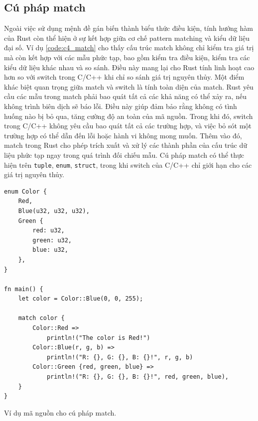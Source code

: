 \subsection{Cú pháp match}

Ngoài việc sử dụng mệnh đề gán biến thành biểu thức điều kiện, tính hướng hàm của Rust còn thể hiện ở sự kết hợp giữa cơ chế pattern matching và kiểu dữ liệu đại số.
Ví dụ \ref{code:c4_match} cho thấy cấu trúc match không chỉ kiểm tra giá trị mà còn kết hợp với các mẫu phức tạp, bao gồm kiểm tra điều kiện, kiểm tra các kiểu dữ liệu khác nhau và so sánh.
Điều này mang lại cho Rust tính linh hoạt cao hơn so với switch trong C/C++ khi chỉ so sánh giá trị nguyên thủy.
Một điểm khác biệt quan trọng giữa match và switch là tính toàn diện của match.
Rust yêu cầu các mẫu trong match phải bao quát tất cả các khả năng có thể xảy ra, nếu không trình biên dịch sẽ báo lỗi.
Điều này giúp đảm bảo rằng không có tình huống nào bị bỏ qua, tăng cường độ an toàn của mã nguồn.
Trong khi đó, switch trong C/C++ không yêu cầu bao quát tất cả các trường hợp, và việc bỏ sót một trường hợp có thể dẫn đến lỗi hoặc hành vi không mong muốn.
Thêm vào đó, match trong Rust cho phép trích xuất và xử lý các thành phần của cấu trúc dữ liệu phức tạp ngay trong quá trình đối chiếu mẫu.
Cú pháp match có thể thực hiện trên \texttt{tuple}, \texttt{enum}, \texttt{struct}, trong khi switch của C/C++ chỉ giới hạn cho các giá trị nguyên thủy.

\begin{listing}[H]
\begin{verbatim}
enum Color {
    Red,
    Blue(u32, u32, u32),
    Green {
        red: u32,
        green: u32,
        blue: u32,
    },
}

fn main() {
    let color = Color::Blue(0, 0, 255);

    match color {
        Color::Red =>
            println!("The color is Red!")
        Color::Blue(r, g, b) =>
            println!("R: {}, G: {}, B: {}!", r, g, b)
        Color::Green {red, green, blue} =>
            println!("R: {}, G: {}, B: {}!", red, green, blue),
    }
}
\end{verbatim}
\caption{Ví dụ mã nguồn cho cú pháp match.}
\label{code:c4_match}
\end{listing}

